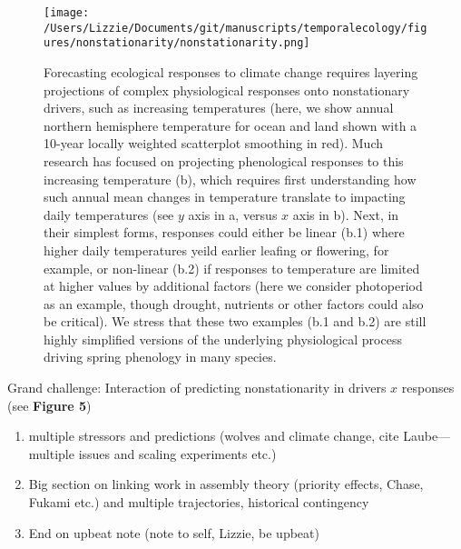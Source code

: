 \documentclass[11pt,a4paper,oneside]{article}
\begin{document}
\begin{figure}[h!]
\centering
\noindent \texttt{[image: /Users/Lizzie/Documents/git/manuscripts/temporalecology/figures/nonstationarity/nonstationarity.png]}
\caption{Forecasting ecological responses to climate change requires layering projections of complex physiological responses onto nonstationary drivers, such as increasing temperatures (here, we show annual northern hemisphere temperature for ocean and land shown with a 10-year locally weighted scatterplot smoothing in red). Much research has focused on projecting phenological responses to this increasing temperature (b), which requires first understanding how such annual mean changes in temperature translate to impacting daily temperatures (see $y$ axis in a, versus $x$ axis in b). Next, in their simplest forms, responses could either be linear (b.1) where higher daily temperatures yeild earlier leafing or flowering, for example, or non-linear (b.2) if responses to temperature are limited at higher values by additional factors (here we consider photoperiod as an example, though drought, nutrients or other factors could also be critical). We stress that these two examples (b.1 and b.2) are still highly simplified versions of the underlying physiological process driving spring phenology in many species.}
\end{figure}

Grand challenge: Interaction of predicting nonstationarity in drivers $x$ responses (see {\bf Figure 5})
\begin{enumerate}
\item multiple stressors and predictions (wolves and climate change, cite Laube---multiple issues and scaling experiments etc.)
\item Big section on linking work in assembly theory (priority effects, Chase, Fukami etc.) and multiple trajectories, historical contingency
\item End on upbeat note (note to self, Lizzie, be upbeat)
\end{enumerate}
\end{document}
